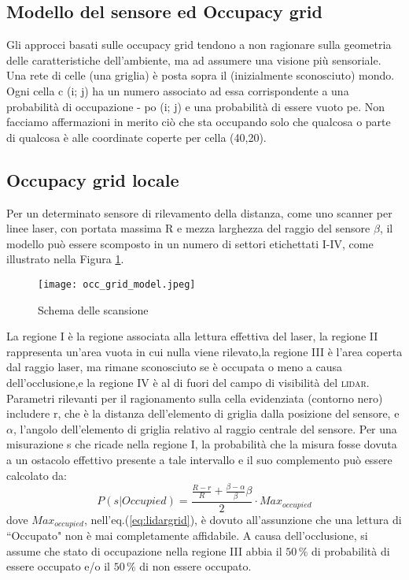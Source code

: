 \subsection{Modello del sensore ed Occupacy grid}

Gli approcci basati sulle occupacy grid tendono a non ragionare sulla geometria 
delle caratteristiche  dell'ambiente, ma ad assumere una visione più sensoriale.
Una rete di celle (una griglia) è posta sopra il (inizialmente sconosciuto) 
mondo. Ogni cella c (i; j) ha un numero associato ad essa corrispondente
a una probabilità di occupazione - po (i; j) e una probabilità di essere vuoto
pe. Non facciamo affermazioni in merito ciò che sta occupando solo che qualcosa
o parte di qualcosa è alle coordinate coperte per cella (40,20).

\subsection{Occupacy grid locale}
Per un determinato sensore di rilevamento della distanza, come uno scanner per 
linee laser, con portata massima R e mezza larghezza del raggio del sensore
$\beta$, il modello può essere scomposto in un numero di settori etichettati 
I-IV, come illustrato nella Figura \ref{fig:scan scheme}.\linebreak
%
\begin{figure}[htb]
  \texttt{[image: occ\_grid\_model.jpeg]}
  \caption{Schema delle scansione}
  \label{fig:scan scheme}
\end{figure}

\noindent La regione I è la regione associata alla lettura effettiva del laser, la
regione II rappresenta un'area vuota in cui nulla viene rilevato,la regione III
è l'area coperta dal raggio laser, ma rimane sconosciuto se è occupata o meno a
causa dell'occlusione,e la regione IV è al di fuori del campo di visibilità del \textsc{lidar}.
Parametri rilevanti per il ragionamento sulla cella evidenziata (contorno nero)
includere r, che è la distanza dell'elemento di griglia dalla posizione del 
sensore, e $\alpha$, l'angolo dell'elemento di griglia relativo al raggio 
centrale del sensore.
Per una misurazione s che ricade nella regione I, la probabilità che la misura
fosse dovuta a un ostacolo effettivo presente a tale intervallo e il suo 
complemento può essere calcolato da:
%
\begin{equation}	
\label{eq:lidargrid}
P(s|Occupied) = \frac{\frac{R-r}{R} + \frac{ \beta- \alpha}{\beta} \beta}{2} 
\cdot Max_{occupied}
\end{equation}
%
dove $Max_{occupied}$, nell'eq.(\ref{eq:lidargrid}), è dovuto all'assunzione 
che una lettura di ``Occupato" non è mai completamente affidabile.
A causa dell'occlusione, si assume che stato di occupazione nella regione III
abbia il $50 \, \%$ di probabilità di essere occupato e/o il $50\,\%$
di non essere occupato.
%
